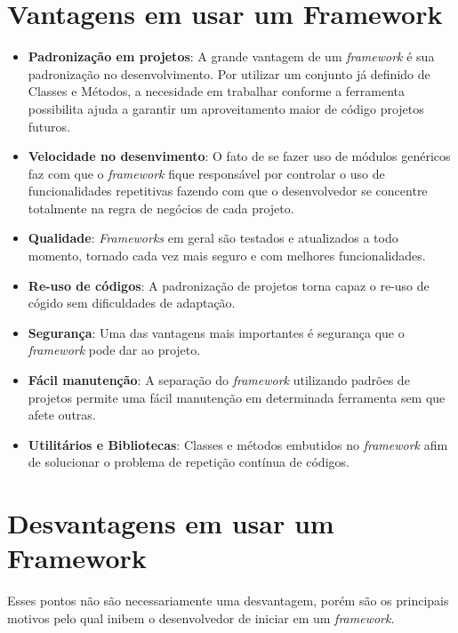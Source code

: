     \section{Vantagens em usar um Framework\label{sec:vantagens-framework}}
        \begin{itemize}
            \item \textbf{Padronização em projetos}: A grande vantagem de um \emph{framework} é sua padronização no desenvolvimento. Por utilizar um conjunto já definido de Classes e Métodos, a necesidade em trabalhar conforme a ferramenta possibilita ajuda a garantir um aproveitamento maior de código projetos futuros.

            \item \textbf{Velocidade no desenvimento}: O fato de se fazer uso de módulos genéricos faz com que o \emph{framework} fique responsável por controlar o uso de funcionalidades repetitivas fazendo com que o desenvolvedor se concentre totalmente na regra de negócios de cada projeto.

            \item \textbf{Qualidade}: \emph{Frameworks} em geral são testados e atualizados a todo momento, tornado cada vez mais seguro e com melhores funcionalidades.

            \item \textbf{Re-uso de códigos}: A padronização de projetos torna capaz o re-uso de cógido sem dificuldades de adaptação.

            \item \textbf{Segurança}: Uma das vantagens mais importantes é segurança que o \emph{framework} pode dar ao projeto.

            \item \textbf{Fácil manutenção}: A separação do \emph{framework} utilizando padrões de projetos permite uma fácil manutenção em determinada ferramenta sem que afete outras.

            \item \textbf{Utilitários e Bibliotecas}: Classes e métodos embutidos no \emph{framework}  afim de solucionar o problema de repetição contínua de códigos.
        \end{itemize}

    \section{Desvantagens em usar um Framework\label{sec:desvantagens-framework}}
        Esses pontos não são necessariamente uma desvantagem, porém são os principais motivos pelo qual inibem o desenvolvedor de iniciar em um \emph{framework}.

